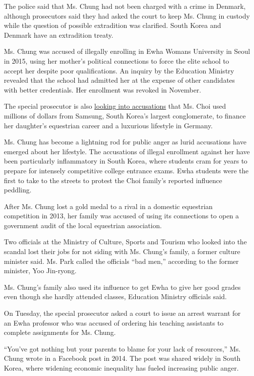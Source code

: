 The police said that Ms. Chung had not been charged with a crime in
Denmark, although prosecutors said they had asked the court to keep Ms.
Chung in custody while the question of possible extradition was
clarified. South Korea and Denmark have an extradition treaty.

Ms. Chung was accused of illegally enrolling in Ewha Womans University
in Seoul in 2015, using her mother's political connections to force the
elite school to accept her despite poor qualifications. An inquiry by
the Education Ministry revealed that the school had admitted her at the
expense of other candidates with better credentials. Her enrollment was
revoked in November.

The special prosecutor is also
\href{http://www.nytimes3xbfgragh.onion/2016/12/31/world/asia/south-korea-samsung-merger-moon-hyung-pyo.html}{looking
into accusations} that Ms. Choi used millions of dollars from Samsung,
South Korea's largest conglomerate, to finance her daughter's equestrian
career and a luxurious lifestyle in Germany.

Ms. Chung has become a lightning rod for public anger as lurid
accusations have emerged about her lifestyle. The accusations of illegal
enrollment against her have been particularly inflammatory in South
Korea, where students cram for years to prepare for intensely
competitive college entrance exams. Ewha students were the first to take
to the streets to protest the Choi family's reported influence peddling.

After Ms. Chung lost a gold medal to a rival in a domestic equestrian
competition in 2013, her family was accused of using its connections to
open a government audit of the local equestrian association.

Two officials at the Ministry of Culture, Sports and Tourism who looked
into the scandal lost their jobs for not siding with Ms. Chung's family,
a former culture minister said. Ms. Park called the officials ``bad
men,'' according to the former minister, Yoo Jin-ryong.

Ms. Chung's family also used its influence to get Ewha to give her good
grades even though she hardly attended classes, Education Ministry
officials said.

On Tuesday, the special prosecutor asked a court to issue an arrest
warrant for an Ewha professor who was accused of ordering his teaching
assistants to complete assignments for Ms. Chung.

``You've got nothing but your parents to blame for your lack of
resources,'' Ms. Chung wrote in a Facebook post in 2014. The post was
shared widely in South Korea, where widening economic inequality has
fueled increasing public anger.

